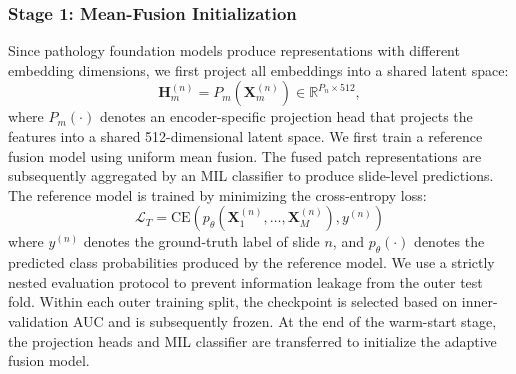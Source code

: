 \subsubsection{Stage 1: Mean-Fusion Initialization}
Since pathology foundation models produce representations with different embedding dimensions, we first project all embeddings into a shared latent space:
\begin{equation}
    \mathbf{H}_{m}^{(n)}
    =
    P_m(\mathbf{X}_{m}^{(n)})
    \in
    \mathbb{R}^{P_n\times 512},
\end{equation}
where \(P_m(\cdot)\) denotes an encoder-specific projection head that projects the features into a shared 512-dimensional latent space.
We first train a reference fusion model using uniform mean fusion.
The fused patch representations are subsequently aggregated by an MIL classifier to produce slide-level predictions.
The reference model is trained by minimizing the cross-entropy loss:
\begin{equation}
    \mathcal{L}_{T}=\mathrm{CE}(p_\theta
(\mathbf{X}_1^{(n)},\ldots,\mathbf{X}_M^{(n)}), y^{(n)})
\end{equation}
where \(y^{(n)}\) denotes the ground-truth label of slide \(n\), and \(p_\theta(\cdot)\) denotes the predicted class probabilities produced by the reference model.
We use a strictly nested evaluation protocol to prevent information leakage from the outer test fold.
Within each outer training split, the checkpoint is selected based on inner-validation AUC and is subsequently frozen.
At the end of the warm-start stage, the projection heads and MIL classifier are transferred to initialize the adaptive fusion model.
